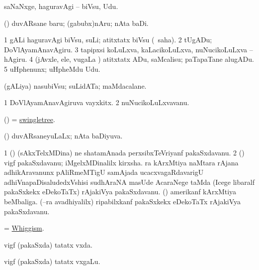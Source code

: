 \bentry
{} 
\gl{\sakirx}
\expl{}
\bmng
saNaNxge, haguravAgi -- biVsu, Udu. 
\emng

\noindent 
\gl{\akirx}
\expl{}
\bmng
(\birx) duvARsane baru; (gabubx)nAru; nAta baDi. 
\emng
\eentry

\bentry
{} 
\gl{\akirx}
\expl{}
\bmng
\bnum
\num{1} gALi haguravAgi biVsu, suLi; atitxtatx biVsu (\sakirx\ saha). 
\num{2} tUgADu; DoVlAyamAnavAgiru. 
\num{3} tapipxsi koLuLxva, kaLacikoLuLxva, nuNucikoLuLxva -- hAgiru. 
\num{4} (jAvxle, ele, \mo vugaLa \vi) atitxtatx ADu, saMcalisu; paTapaTane alugADu. 
\num{5} uHphenunx; uHpheMdu Udu. 
\enum
\emng
\eentry

\bentry
{} 
\gl{\nA}
\expl{}
\bmng
(gALiya) nasubiVsu; suLidATa; maMdacalane. 
\emng
\eentry

\bentry
{} 
\gl{\nA}
\expl{}
\bmng
\bnum
\num{1} DoVlAyamAnavAgiruva vayxkitx. 
\num{2} nuNucikoLuLxvavanu. 
\enum
\emng
\eentry

\bentry
{} 
\gl{\nA}
\expl{}
\bmng
(\ame) = \hyperref{kandict_s.pdf}{S}{swingletree}{swingletree}. 
\emng
\eentry

\bentry
{} 
\gl{\gu}
\bmng
(\AmA) duvARsaneyuLaLx; nAta baDiyuva. 
\emng
\eentry

\bentry
{} 
\gl{\nA}
\expl{}
\bmng
\bnum
\num{1} (\ca) (sAkxTelxMDina) ne shatamAnada perxsibxTeVriyanf pakaSxdavanu. 
\num{2} (\rAshA) vigf pakaSxdavanu; iMgelxMDinalilx kirxsha. ra kArxMtiya naMtara rAjana adhikAravanunx pAliRmeMTigU samAjada ucacxvagaRdavarigU adhiVnapaDisaludedxVshisi sudhAraNA masUde AcaraNege taMda (Icege libaralf pakaSxkekx eDekoTaTx) rAjakiVya pakaSxdavanu. 
 (\ame) 
\banum
{} amerikanf kArxMtiya beMbaliga. 
 (--ra avadhiyalilx) ripabilxkanf pakaSxkekx eDekoTaTx rAjakiVya pakaSxdavanu. 
\eanum
\numie
\enum
\emng
\eentry

\bentry
{} 
\gl{\nA}
\expl{}
\bmng
= \hyperlink{Whiggism}{Whiggism}. 
\emng
\eentry

\bentry
{} 
\gl{\gu}
\expl{}
\bmng
vigf (pakaSxda) tatatx vxda. 
\emng
\eentry

\bentry
{} 
\gl{\nA}
\expl{}
\bmng
vigf (pakaSxda) tatatx vxgaLu. 
\emng
\eentry

